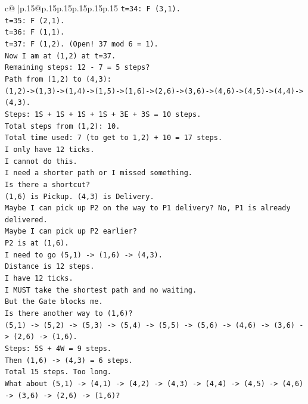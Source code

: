 \documentclass{article}
\begin{document}
{\begin{supertabular}{c@{$\;$}|p{.15\linewidth}@{}p{.15\linewidth}p{.15\linewidth}p{.15\linewidth}p{.15\linewidth}p{.15\linewidth}}
{{{\texttt{t=34: F (3,1).} \\
\texttt{t=35: F (2,1).} \\
\texttt{t=36: F (1,1).} \\
\texttt{t=37: F (1,2). (Open! 37 mod 6 = 1).} \\
\texttt{Now I am at (1,2) at t=37.} \\
\texttt{Remaining steps: 12 {-} 7 = 5 steps?} \\
\texttt{Path from (1,2) to (4,3):} \\
\texttt{(1,2){-}>(1,3){-}>(1,4){-}>(1,5){-}>(1,6){-}>(2,6){-}>(3,6){-}>(4,6){-}>(4,5){-}>(4,4){-}>(4,3).} \\
\texttt{Steps: 1S + 1S + 1S + 1S + 3E + 3S = 10 steps.} \\
\texttt{Total steps from (1,2): 10.} \\
\texttt{Total time used: 7 (to get to 1,2) + 10 = 17 steps.} \\
\texttt{I only have 12 ticks.} \\
\texttt{I cannot do this.} \\
\texttt{I need a shorter path or I missed something.} \\
\texttt{Is there a shortcut?} \\
\texttt{(1,6) is Pickup. (4,3) is Delivery.} \\
\texttt{Maybe I can pick up P2 on the way to P1 delivery? No, P1 is already delivered.} \\
\texttt{Maybe I can pick up P2 earlier?} \\
\texttt{P2 is at (1,6).} \\
\texttt{I need to go (5,1) {-}> (1,6) {-}> (4,3).} \\
\texttt{Distance is 12 steps.} \\
\texttt{I have 12 ticks.} \\
\texttt{I MUST take the shortest path and no waiting.} \\
\texttt{But the Gate blocks me.} \\
\texttt{Is there another way to (1,6)?} \\
\texttt{(5,1) {-}> (5,2) {-}> (5,3) {-}> (5,4) {-}> (5,5) {-}> (5,6) {-}> (4,6) {-}> (3,6) {-}> (2,6) {-}> (1,6).} \\
\texttt{Steps: 5S + 4W = 9 steps.} \\
\texttt{Then (1,6) {-}> (4,3) = 6 steps.} \\
\texttt{Total 15 steps. Too long.} \\
\texttt{What about (5,1) {-}> (4,1) {-}> (4,2) {-}> (4,3) {-}> (4,4) {-}> (4,5) {-}> (4,6) {-}> (3,6) {-}> (2,6) {-}> (1,6)?} \\
}}}
\end{supertabular}}
\end{document}
